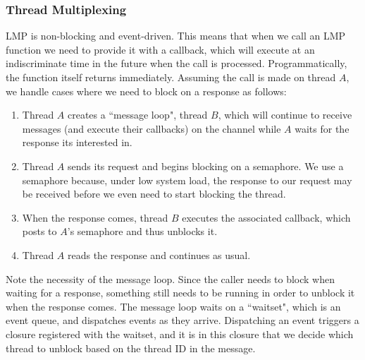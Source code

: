 \subsubsection{Thread Multiplexing}
LMP is non-blocking and event-driven. This means that when we call an LMP function we need to provide it with a callback, which will execute at an indiscriminate time in the future when the call is processed. Programmatically, the function itself returns immediately. Assuming the call is made on thread $A$, we handle cases where we need to block on a response as follows:
\begin{enumerate}[itemsep=0pt]
    \item Thread $A$ creates a ``message loop", thread $B$, which will continue to receive messages (and execute their callbacks) on the channel while $A$ waits for the response its interested in.
    \item Thread $A$ sends its request and begins blocking on a semaphore. We use a semaphore because, under low system load, the response to our request may be received before we even need to start blocking the thread.
    \item When the response comes, thread $B$ executes the associated callback, which posts to $A$'s semaphore and thus unblocks it.
    \item Thread $A$ reads the response and continues as usual.
\end{enumerate}
Note the necessity of the message loop. Since the caller needs to block when waiting for a response, something still needs to be running in order to unblock it when the response comes. The message loop waits on a ``waitset", which is an event queue, and dispatches events as they arrive. Dispatching an event triggers a closure registered with the waitset, and it is in this closure that we decide which thread to unblock based on the thread ID in the message.

